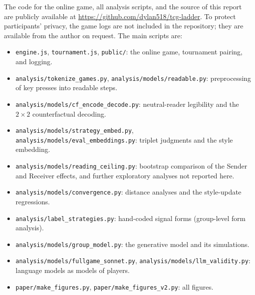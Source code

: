 \documentclass[stu,11pt,floatsintext,donotrepeattitle]{apa7}
\begin{document}
The code for the online game, all analysis scripts, and the source of this report are publicly available at \url{https://github.com/dylan518/tcg-ladder}. To protect participants' privacy, the game logs are not included in the repository; they are available from the author on request. The main scripts are:
\begin{itemize}
\item \texttt{engine.js}, \texttt{tournament.js}, \texttt{public/}: the online game, tournament pairing, and logging.
\item \texttt{analysis/tokenize\_games.py}, \texttt{analysis/models/readable.py}: preprocessing of key presses into readable steps.
\item \texttt{analysis/models/cf\_encode\_decode.py}: neutral-reader legibility and the $2 \times 2$ counterfactual decoding.
\item \texttt{analysis/models/strategy\_embed.py}, \texttt{analysis/models/eval\_embeddings.py}: triplet judgments and the style embedding.
\item \texttt{analysis/models/reading\_ceiling.py}: bootstrap comparison of the Sender and Receiver effects, and further exploratory analyses not reported here.
\item \texttt{analysis/models/convergence.py}: distance analyses and the style-update regressions.
\item \texttt{analysis/label\_strategies.py}: hand-coded signal forms (group-level form analysis).
\item \texttt{analysis/models/group\_model.py}: the generative model and its simulations.
\item \texttt{analysis/models/fullgame\_sonnet.py}, \texttt{analysis/models/llm\_validity.py}: language models as models of players.
\item \texttt{paper/make\_figures.py}, \texttt{paper/make\_figures\_v2.py}: all figures.
\end{itemize}
\end{document}
